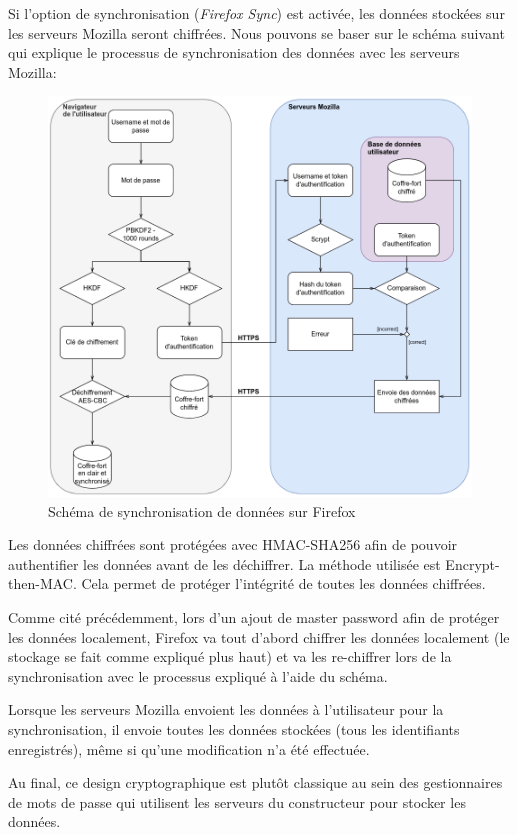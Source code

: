 Si l'option de synchronisation (\textit{Firefox Sync}) est activée\cite{firefoxsync}, les données stockées sur les serveurs Mozilla seront chiffrées. Nous pouvons se baser sur le schéma suivant qui explique le processus de synchronisation des données avec les serveurs Mozilla:
\begin{figure}[H]
	\includegraphics[width=15.5cm]{images/firefox_sync.png}
		\centering
	\caption{Schéma de synchronisation de données sur Firefox}
\end{figure}

Les données chiffrées sont protégées avec HMAC-SHA256 afin de pouvoir authentifier les données avant de les déchiffrer. La méthode utilisée est Encrypt-then-MAC. Cela permet de protéger l'intégrité de toutes les données chiffrées.

Comme cité précédemment, lors d'un ajout de master password afin de protéger les données localement, Firefox va tout d'abord chiffrer les données localement (le stockage se fait comme expliqué plus haut) et va les re-chiffrer lors de la synchronisation avec le processus expliqué à l'aide du schéma.

Lorsque les serveurs Mozilla envoient les données à l'utilisateur pour la synchronisation, il envoie toutes les données stockées (tous les identifiants enregistrés),  même si qu'une modification n'a été effectuée.

Au final, ce design cryptographique est plutôt classique au sein des gestionnaires de mots de passe qui utilisent les serveurs du constructeur pour stocker les données.

